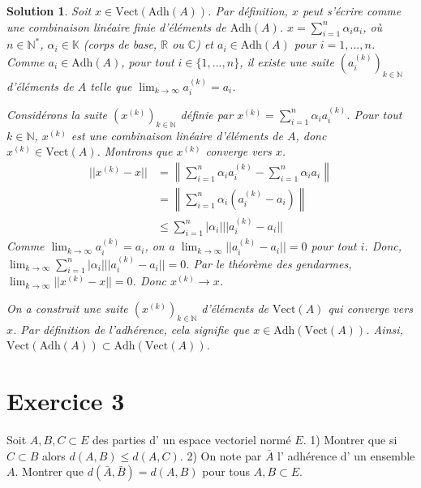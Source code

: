 \documentclass{article}
\newtheorem{solution}{Solution}
\begin{document}
\begin{solution}
Soit $x \in \text{Vect}(\text{Adh}(A))$.
Par définition, $x$ peut s'écrire comme une combinaison linéaire finie d'éléments de $\text{Adh}(A)$.
$x = \sum_{i=1}^n \alpha_i a_i$, où $n \in \mathbb{N}^*$, $\alpha_i \in \mathbb{K}$ (corps de base, $\mathbb{R}$ ou $\mathbb{C}$) et $a_i \in \text{Adh}(A)$ pour $i=1,...,n$.
Comme $a_i \in \text{Adh}(A)$, pour tout $i \in \{1,...,n\}$, il existe une suite $(a_i^{(k)})_{k \in \mathbb{N}}$ d'éléments de $A$ telle que $\lim_{k \to \infty} a_i^{(k)} = a_i$.

Considérons la suite $(x^{(k)})_{k \in \mathbb{N}}$ définie par $x^{(k)} = \sum_{i=1}^n \alpha_i a_i^{(k)}$.
Pour tout $k \in \mathbb{N}$, $x^{(k)}$ est une combinaison linéaire d'éléments de $A$, donc $x^{(k)} \in \text{Vect}(A)$.
Montrons que $x^{(k)}$ converge vers $x$.
\begin{align*} ||x^{(k)} - x|| &= \left\| \sum_{i=1}^n \alpha_i a_i^{(k)} - \sum_{i=1}^n \alpha_i a_i \right\| \\ &= \left\| \sum_{i=1}^n \alpha_i (a_i^{(k)} - a_i) \right\| \\ &\le \sum_{i=1}^n |\alpha_i| ||a_i^{(k)} - a_i|| \end{align*}
Comme $\lim_{k \to \infty} a_i^{(k)} = a_i$, on a $\lim_{k \to \infty} ||a_i^{(k)} - a_i|| = 0$ pour tout $i$.
Donc, $\lim_{k \to \infty} \sum_{i=1}^n |\alpha_i| ||a_i^{(k)} - a_i|| = 0$.
Par le théorème des gendarmes, $\lim_{k \to \infty} ||x^{(k)} - x|| = 0$.
Donc $x^{(k)} \to x$.

On a construit une suite $(x^{(k)})_{k \in \mathbb{N}}$ d'éléments de $\text{Vect}(A)$ qui converge vers $x$.
Par définition de l'adhérence, cela signifie que $x \in \text{Adh}(\text{Vect}(A))$.
Ainsi, $\text{Vect}(\text{Adh}(A)) \subset \text{Adh}(\text{Vect}(A))$.
\end{solution}

\section*{Exercice 3}
Soit $A, B, C \subset E$ des parties d' un espace vectoriel normé $E$.
1) Montrer que si $C \subset B$ alors $d(A, B) \le d(A, C)$.
2) On note par $\bar{A}$ l' adhérence d' un ensemble $A$. Montrer que $d(\bar{A}, \bar{B}) = d(A, B)$ pour tous $A, B \subset E$.
\end{document}
